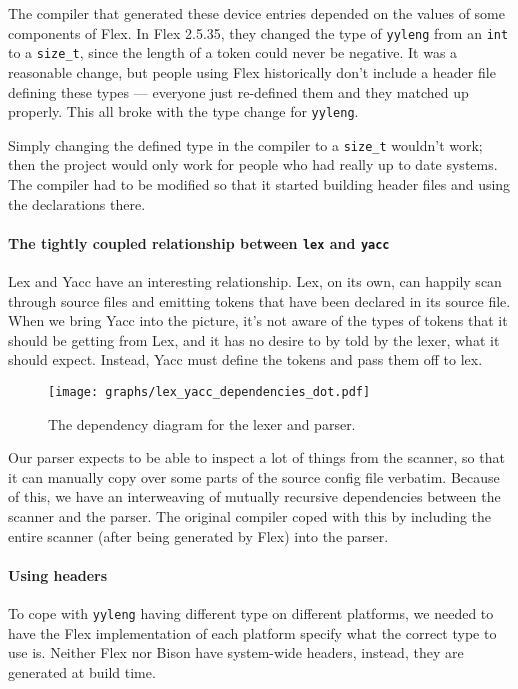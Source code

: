 \documentclass[12pt]{article}
\newcommand{\code}[1]{{\tt #1}}
\begin{document}
The compiler that generated these device entries depended on the values of some
components of Flex. In Flex 2.5.35, they changed the type of \code{yyleng} from
an \code{int} to a \code{size\_t}, since the length of a token could never be
negative. It was a reasonable change, but people using Flex historically don't
include a header file defining these types \---- everyone just re-defined them
and they matched up properly. This all broke with the type change for
\code{yyleng}.

Simply changing the defined type in the compiler to a \code{size\_t} wouldn't
work; then the project would only work for people who had really up to date
systems. The compiler had to be modified so that it started building header
files and using the declarations there.

\paragraph{The tightly coupled relationship between \code{lex} and \code{yacc}}
Lex and Yacc have an interesting relationship. Lex, on its own, can happily scan
through source files and emitting tokens that have been declared in its source
file. When we bring Yacc into the picture, it's not aware of the types of
tokens that it should be getting from Lex, and it has no desire to by told by
the lexer, what it should expect. Instead, Yacc must define the tokens and pass
them off to lex.

\begin{figure}
\caption{The dependency diagram for the lexer and parser.}
\label{lex-yacc-dependencies}
\texttt{[image: graphs/lex\_yacc\_dependencies\_dot.pdf]}
\end{figure}

Our parser expects to be able to inspect a lot of things from the scanner, so
that it can manually copy over some parts of the source config file verbatim.
Because of this, we have an interweaving of mutually recursive dependencies
between the scanner and the parser. The original compiler coped with this by
including the entire scanner (after being generated by Flex) into the parser.

\paragraph{Using headers}
To cope with \code{yyleng} having different type on different platforms, we
needed to have the Flex implementation of each platform specify what the
correct type to use is. Neither Flex nor Bison have system-wide headers,
instead, they are generated at build time.
\end{document}
